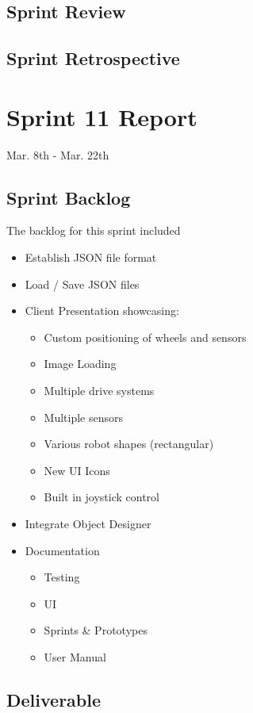 \subsection{Sprint Review}


\subsection{Sprint Retrospective}
\section{Sprint 11 Report}
Mar. 8th - Mar. 22th
\subsection{Sprint Backlog}

The backlog for this sprint included

\begin{itemize}
	\item Establish JSON file format
	\item Load / Save JSON files	
	\item Client Presentation showcasing:
	\begin{itemize}
		\item Custom positioning of wheels and sensors
		\item Image Loading	
		\item Multiple drive systems
		\item Multiple sensors
		\item Various robot shapes (rectangular)
		\item New UI Icons
		\item Built in joystick control
	\end{itemize}
	\item Integrate Object Designer
	\item Documentation	
	\begin{itemize}
		\item Testing
		\item UI
		\item Sprints & Prototypes
		\item User Manual
	\end{itemize}
\end{itemize}

\subsection{Deliverable}

